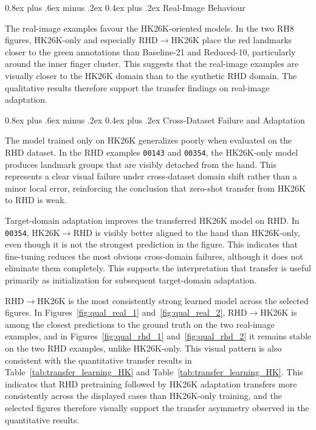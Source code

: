 \documentclass[10pt,letterpaper]{article}
\makeatletter
\renewcommand\subsubsection{\@startsection{subsubsection}{3}{\z@}%
  {0.8ex plus .6ex minus .2ex}%
  {0.4ex plus .2ex}%
  {\normalfont\small\itshape}}
\makeatother
\begin{document}
\subsubsection{Real-Image Behaviour}

\medskip
\noindent
The real-image examples favour the HK26K-oriented models. In the two RH8 figures, HK26K-only and especially RHD$\rightarrow$HK26K place the red landmarks closer to the green annotations than Baseline-21 and Reduced-10, particularly around the inner finger cluster. This suggests that the real-image examples are visually closer to the HK26K domain than to the synthetic RHD domain. The qualitative results therefore support the transfer findings on real-image adaptation.

\subsubsection{Cross-Dataset Failure and Adaptation}

\medskip
\noindent
The model trained only on HK26K generalizes poorly when evaluated on the RHD dataset. In the RHD examples \texttt{00143} and \texttt{00354}, the HK26K-only model produces landmark groups that are visibly detached from the hand. This represents a clear visual failure under cross-dataset domain shift rather than a minor local error, reinforcing the conclusion that zero-shot transfer from HK26K to RHD is weak.

\medskip
\noindent
Target-domain adaptation improves the transferred HK26K model on RHD. In \texttt{00354}, HK26K$\rightarrow$RHD is visibly better aligned to the hand than HK26K-only, even though it is not the strongest prediction in the figure. This indicates that fine-tuning reduces the most obvious cross-domain failures, although it does not eliminate them completely. This supports the interpretation that transfer is useful primarily as initialization for subsequent target-domain adaptation.

\medskip
\noindent
RHD$\rightarrow$HK26K is the most consistently strong learned model across the selected figures. In Figures~\ref{fig:qual_real_1} and~\ref{fig:qual_real_2}, RHD$\rightarrow$HK26K is among the closest predictions to the ground truth on the two real-image examples, and in Figures~\ref{fig:qual_rhd_1} and~\ref{fig:qual_rhd_2} it remains stable on the two RHD examples, unlike HK26K-only. This visual pattern is also consistent with the quantitative transfer results in Table~\ref{tab:transfer_learning_HK} and Table~\ref{tab:transfer_learning_HK}. This indicates that RHD pretraining followed by HK26K adaptation transfers more consistently across the displayed cases than HK26K-only training, and the selected figures therefore visually support the transfer asymmetry observed in the quantitative results.
\end{document}
